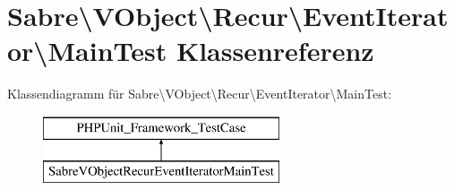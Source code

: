 \hypertarget{class_sabre_1_1_v_object_1_1_recur_1_1_event_iterator_1_1_main_test}{}\section{Sabre\textbackslash{}V\+Object\textbackslash{}Recur\textbackslash{}Event\+Iterator\textbackslash{}Main\+Test Klassenreferenz}
\label{class_sabre_1_1_v_object_1_1_recur_1_1_event_iterator_1_1_main_test}
Klassendiagramm für Sabre\textbackslash{}V\+Object\textbackslash{}Recur\textbackslash{}Event\+Iterator\textbackslash{}Main\+Test\+:\begin{figure}[H]
\begin{center}
\leavevmode
\includegraphics[height=2.000000cm]{class_sabre_1_1_v_object_1_1_recur_1_1_event_iterator_1_1_main_test}
\end{center}
\end{figure}
